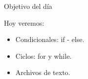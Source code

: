 \begin{frame}[t]{Objetivo del d\'ia}\vspace{10pt}

Hoy veremos:

\begin{itemize}
	\item Condicionales: if - else.
	\item Ciclos: for y while.
	\item Archivos de texto.
\end{itemize}

\end{frame}